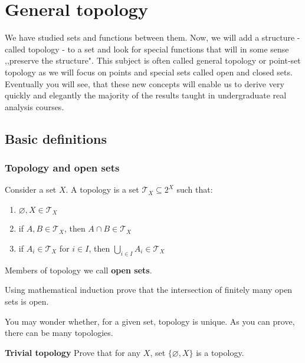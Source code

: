 
\newcommand{\Int}{\text{Int\,}}
\newcommand{\Cl}{\text{Cl\,}}
\newcommand{\Ext}{\text{Ext\,}}
\newcommand{\Fr}{\text{Fr\,}}

\chapter{General topology}
\label{general_topology}
We have studied sets and functions between them. Now, we will add
a structure - called topology - to a set and look for special
functions that will in some sense ,,preserve the structure". This
subject is often called general topology or point-set topology as
we will focus on points and special sets called open and closed sets.
Eventually you will see, that these new concepts will enable us
to derive very quickly and elegantly the majority of the results
taught in undergraduate real analysis courses.

\section{Basic definitions}
\subsection{Topology and open sets}
Consider a set $X$. A topology is a set $\mathcal{T}_X \subseteq 2^X $ such that:
\begin{enumerate}
	\item $\varnothing, X\in \mathcal{T}_X$
	\item if $A, B\in \mathcal{T}_X$, then $A\cap B\in \mathcal{T}_X$
	\item if $A_i\in \mathcal{T}_X$ for $i\in I$, then $\bigcup_{i\in I} A_i\in \mathcal T_X$
\end{enumerate}
Members of topology we call \textbf{open sets}.

\begin{prob}
	Using mathematical induction prove that the intersection of finitely many open sets is open.
\end{prob}

You may wonder whether, for a given set, topology is unique. As you can prove, there can be many topologies.

\begin{prob}
	\textbf{Trivial topology} Prove that for any $X$, set $\{\varnothing, X\}$ is a topology.
\end{prob}

